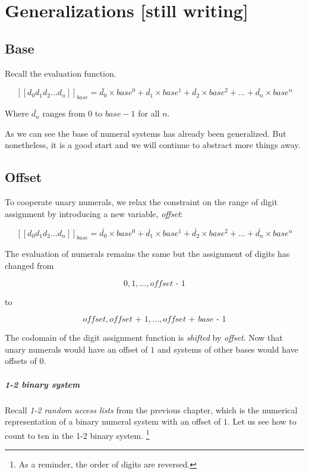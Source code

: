 \documentclass[../thesis.tex]{subfiles}
\begin{document}
\chapter{Generalizations [still writing]}\label{generalizations}


\section{Base}

Recall the evaluation function.

$$
    [\![d_0d_1d_2...d_n]\!]_{base}
    =
    \bar{d_0}\times base^0 + \bar{d_1}\times base^1 + \bar{d_2}\times base^2 + ... + \bar{d_n}\times base^n
$$

Where $ \bar{d_n} $ ranges from $ 0 $ to $ base - 1 $ for all $ n $.

As we can see the base of numeral systems has already been generalized.
But nonetheless, it is a good start and we will continue to abstract more things
away.

\section{Offset}

To cooperate unary numerals, we relax the constraint on the range of digit
assignment by introducing a new variable, \textit{offset}:

$$
    [\![d_0d_1d_2...d_n]\!]_{base}
    =
    \bar{d_0}\times base^0 + \bar{d_1}\times base^1 + \bar{d_2}\times base^2 + ... + \bar{d_n}\times base^n
$$

The evaluation of numerals remains the same but the assignment of digits has changed from

$$
    { 0, 1, ..., \textit{offset - 1} }
$$

to

$$
    { \textit{offset}, \textit{offset + 1}, ..., \textit{offset + base - 1} }
$$

The codomain of the digit assignment function is \textit{shifted} by \textit{offset}.
Now that unary numerals would have an offset of $ 1 $
and systems of other bases would have offsets of $ 0 $.

\paragraph{1-2 binary system}
Recall \textit{1-2 random access lists} from the previous chapter,
which is the numerical representation of a binary numeral system with an offset
of $ 1 $.
Let us see how to count to ten in the 1-2 binary system.
\footnote{As a reminder, the order of digits are reversed.}
\end{document}
